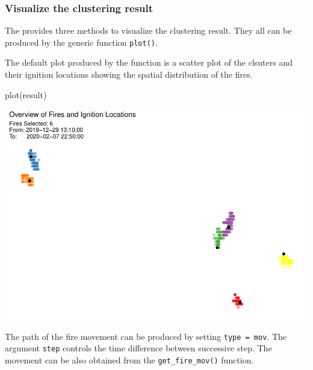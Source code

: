\hypertarget{visualize-the-clustering-result}{%
\subsubsection{Visualize the clustering
result}\label{visualize-the-clustering-result}}

The  provides three methods to visualize the
clustering result. They all can be produced by the generic function
\texttt{plot()}.

The default plot produced by the function is a scatter plot of the
clsuters and their ignition locations showing the spatial distribution
of the fires.

\begin{Schunk}
\begin{Sinput}
plot(result)
\end{Sinput}


\begin{center}\includegraphics[width=0.8\linewidth]{clustering_paper_files/figure-latex/unnamed-chunk-10-1} \end{center}

\end{Schunk}

The path of the fire movement can be produced by setting
\texttt{type\ =\ \textquotesingle{}mov\textquotesingle{}}. The argument
\texttt{step} controls the time difference between successive step. The
movement can be also obtained from the \texttt{get\_fire\_mov()}
function.

